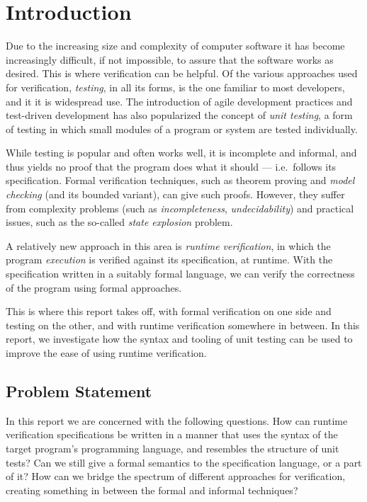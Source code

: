 
\pagestyle{newchap}
\chapter{Introduction} \label{chapter-introduction}

Due to the increasing size and complexity of computer software it has become
increasingly difficult, if not impossible, to assure that the software
works as desired. This is where verification can be helpful. Of the various
approaches used for verification, \textit{testing}, in all its forms, is the
one familiar to most developers, and it it is widespread use. The introduction
of agile development practices and test-driven development has also popularized
the concept of \textit{unit testing}, a form of testing in which small modules
of a program or system are tested individually.

While testing is popular and often works well, it is incomplete and informal,
and thus yields no proof that the program does what it should --- i.e.\ follows
its specification. Formal verification techniques, such as theorem proving and
\textit{model checking} (and its bounded variant), can give such proofs.
However, they suffer from complexity problems (such as \textit{incompleteness},
\textit{undecidability}) and practical issues, such as the so-called
\textit{state explosion} problem.

A relatively new approach in this area is \textit{runtime verification}, in
which the program \textit{execution} is verified against its specification, at
runtime. With the specification written in a suitably formal language, we can
verify the correctness of the program using formal approaches.

This is where this report takes off, with formal verification on one side and
testing on the other, and with runtime verification somewhere in between. In
this report, we investigate how the syntax and tooling of unit testing can be
used to improve the ease of using runtime verification.


\section{Problem Statement} \label{section-problem-statement}

In this report we are concerned with the following questions. How can runtime
verification specifications be written in a manner that uses the syntax of the
target program's programming language, and resembles the structure of unit
tests? Can we still give a formal semantics to the specification language, or a
part of it? How can we bridge the spectrum of different approaches for
verification, creating something in between the formal and informal techniques?


